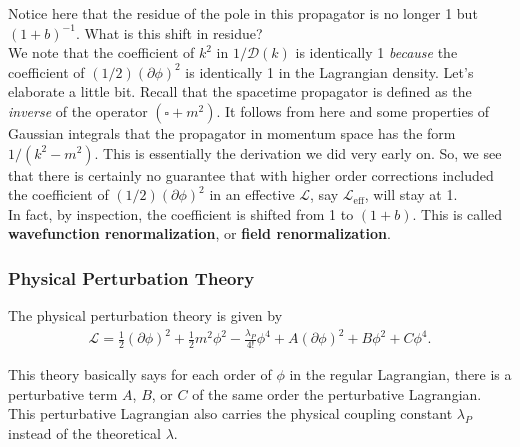 \documentclass{book}
\theoremstyle{definition}
\newcommand{\p}{\partial}
\newcommand{\lag}{\mathcal{L}}
\newcommand{\f}[2]{\frac{#1}{#2}}
\newcommand{\D}{\mathcal{D}}
\begin{document}
Notice here that the residue of the pole in this propagator is no longer 1 but $(1+b)^{-1}$. What is this shift in residue? \\

We note that the coefficient of $k^2$ in $1/\D(k)$ is identically 1 \textit{because} the coefficient of $(1/2)(\p \phi)^2$ is identically 1 in the Lagrangian density. Let's elaborate a little bit. Recall that the spacetime propagator is defined as the \textit{inverse} of the operator $(\square + m^2)$. It follows from here and some properties of Gaussian integrals that the propagator in momentum space has the form $1/(k^2 - m^2)$. This is essentially the derivation we did very early on. So, we see that there is certainly no guarantee that with higher order corrections included the coefficient of $(1/2)(\p \phi)^2$ in an effective $\lag$, say $\lag_{\text{eff}}$, will stay at 1. \\

In fact, by inspection, the coefficient is shifted from 1 to $(1+b)$. This is called \textbf{wavefunction renormalization}, or \textbf{field renormalization}. 






\subsubsection{Physical Perturbation Theory}

The physical perturbation theory is given by
\begin{align}
\boxed{ \lag = \f{1}{2}(\p \phi)^2 + \f{1}{2}m^2 \phi^2 - \f{\lambda_P}{4!}\phi^4 + A(\p \phi)^2 + B\phi^2 + C\phi^4.} 
\end{align}


This theory basically says for each order of $\phi$ in the regular Lagrangian, there is a perturbative term $A$, $B$, or $C$ of the same order the perturbative Lagrangian. This perturbative Lagrangian also carries the physical coupling constant $\lambda_P$ instead of the theoretical $\lambda$. \\
\end{document}
